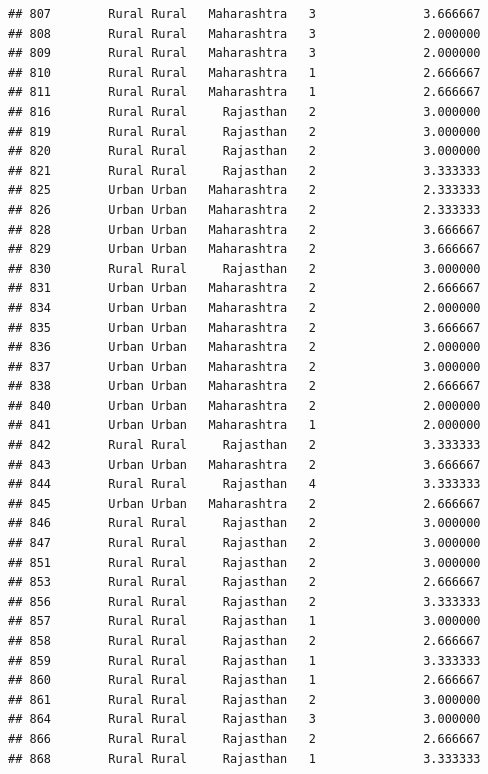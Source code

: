 \documentclass[
]{article}
\begin{document}
\begin{verbatim}
## 807        Rural Rural   Maharashtra   3               3.666667
## 808        Rural Rural   Maharashtra   3               2.000000
## 809        Rural Rural   Maharashtra   3               2.000000
## 810        Rural Rural   Maharashtra   1               2.666667
## 811        Rural Rural   Maharashtra   1               2.666667
## 816        Rural Rural     Rajasthan   2               3.000000
## 819        Rural Rural     Rajasthan   2               3.000000
## 820        Rural Rural     Rajasthan   2               3.000000
## 821        Rural Rural     Rajasthan   2               3.333333
## 825        Urban Urban   Maharashtra   2               2.333333
## 826        Urban Urban   Maharashtra   2               2.333333
## 828        Urban Urban   Maharashtra   2               3.666667
## 829        Urban Urban   Maharashtra   2               3.666667
## 830        Rural Rural     Rajasthan   2               3.000000
## 831        Urban Urban   Maharashtra   2               2.666667
## 834        Urban Urban   Maharashtra   2               2.000000
## 835        Urban Urban   Maharashtra   2               3.666667
## 836        Urban Urban   Maharashtra   2               2.000000
## 837        Urban Urban   Maharashtra   2               3.000000
## 838        Urban Urban   Maharashtra   2               2.666667
## 840        Urban Urban   Maharashtra   2               2.000000
## 841        Urban Urban   Maharashtra   1               2.000000
## 842        Rural Rural     Rajasthan   2               3.333333
## 843        Urban Urban   Maharashtra   2               3.666667
## 844        Rural Rural     Rajasthan   4               3.333333
## 845        Urban Urban   Maharashtra   2               2.666667
## 846        Rural Rural     Rajasthan   2               3.000000
## 847        Rural Rural     Rajasthan   2               3.000000
## 851        Rural Rural     Rajasthan   2               3.000000
## 853        Rural Rural     Rajasthan   2               2.666667
## 856        Rural Rural     Rajasthan   2               3.333333
## 857        Rural Rural     Rajasthan   1               3.000000
## 858        Rural Rural     Rajasthan   2               2.666667
## 859        Rural Rural     Rajasthan   1               3.333333
## 860        Rural Rural     Rajasthan   1               2.666667
## 861        Rural Rural     Rajasthan   2               3.000000
## 864        Rural Rural     Rajasthan   3               3.000000
## 866        Rural Rural     Rajasthan   2               2.666667
## 868        Rural Rural     Rajasthan   1               3.333333

\end{verbatim}
\end{document}
